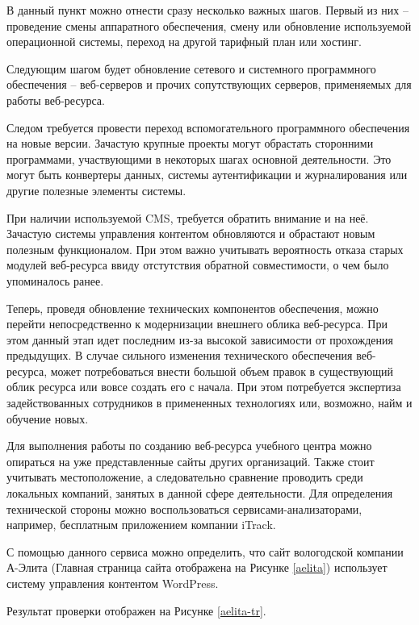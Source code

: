 В данный пункт можно отнести сразу несколько важных шагов.
Первый из них -- проведение смены аппаратного обеспечения, смену или обновление используемой операционной системы, переход на другой тарифный план или хостинг.

Следующим шагом будет обновление сетевого и системного программного обеспечения -- веб-серверов и прочих сопутствующих серверов, применяемых для работы веб-ресурса.

Следом требуется провести переход вспомогательного программного обеспечения на новые версии.
Зачастую крупные проекты могут обрастать сторонними программами, участвующими в некоторых шагах основной деятельности.
Это могут быть конвертеры данных, системы аутентификации и журналирования или другие полезные элементы системы.

При наличии используемой CMS, требуется обратить внимание и на неё.
Зачастую системы управления контентом обновляются и обрастают новым полезным функционалом.
При этом важно учитывать вероятность отказа старых модулей веб-ресурса ввиду отстутствия обратной совместимости, о чем было упоминалось ранее.

Теперь, проведя обновление технических компонентов обеспечения, можно перейти непосредственно к модернизации внешнего облика веб-ресурса.
При этом данный этап идет последним из-за высокой зависимости от прохождения предыдущих.
В случае сильного изменения технического обеспечения веб-ресурса, может потребоваться внести большой объем правок в существующий облик ресурса или вовсе создать его с начала.
При этом потребуется экспертиза задействованных сотрудников в примененных технологиях или, возможно, найм и обучение новых.

Для выполнения работы по созданию веб-ресурса учебного центра можно опираться на уже представленные сайты других организаций.
Также стоит учитывать местоположение, а следовательно сравнение проводить среди локальных компаний, занятых в данной сфере деятельности.
Для определения технической стороны можно воспользоваться сервисами-анализаторами, например, бесплатным приложением \cite{iTrack} компании iTrack. 

С помощью данного сервиса можно определить, что сайт вологодской компании А-Элита \cite{aelita} (Главная страница сайта отображена на Рисунке \ref{aelita}) использует систему управления контентом WordPress.


Результат проверки отображен на Рисунке \ref{aelita-tr}.

